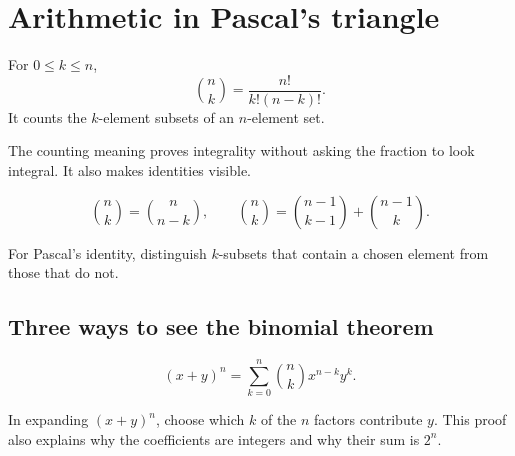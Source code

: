 \chapter{Arithmetic in Pascal's triangle}
\label{chap:binomial}

\begin{definition}
For $0\le k\le n$,
\[
\binom nk=\frac{n!}{k!(n-k)!}.
\]
It counts the $k$-element subsets of an $n$-element set.
\end{definition}

The counting meaning proves integrality without asking the fraction to look integral. It also makes identities visible.

\begin{proposition}
\[
\binom nk=\binom n{n-k},\qquad
\binom nk=\binom{n-1}{k-1}+\binom{n-1}{k}.
\]
\end{proposition}

For Pascal's identity, distinguish $k$-subsets that contain a chosen element from those that do not.

\begin{center}
\end{center}

\section{Three ways to see the binomial theorem}

\begin{theorem}
\[
(x+y)^n=\sum_{k=0}^n\binom nk x^{n-k}y^k.
\]
\end{theorem}

In expanding $(x+y)^n$, choose which $k$ of the $n$ factors contribute $y$. This proof also explains why the coefficients are integers and why their sum is $2^n$.

